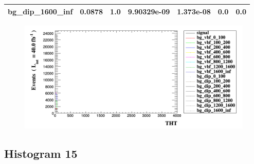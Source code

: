 \documentclass[a4paper, 10pt]{article}
\begin{document}
\begin{table}[H]
\begin{center}
\begin{tabular}{|m{23.0mm}|m{23.0mm}|m{18.0mm}|m{19.0mm}|m{19.0mm}|m{19.0mm}|m{19.0mm}|}
      \hline
      {\cellcolor{white}         bg\_dip\_1600\_inf}& {\cellcolor{white}         0.0878}& {\cellcolor{white}         1.0}& {\cellcolor{white}         9.90329e-09}& {\cellcolor{white}         1.373e-08}& {\cellcolor{green}         0.0}& {\cellcolor{green}         0.0}\\
\hline
    \end{tabular}
  \end{center}
\end{table}

\begin{figure}[H]
  \begin{center}
    \includegraphics[scale=0.45]{selection_13.png}\\
\caption{   }
  \end{center}
\end{figure}
      \newpage
\subsection{ Histogram 15}
\end{document}
